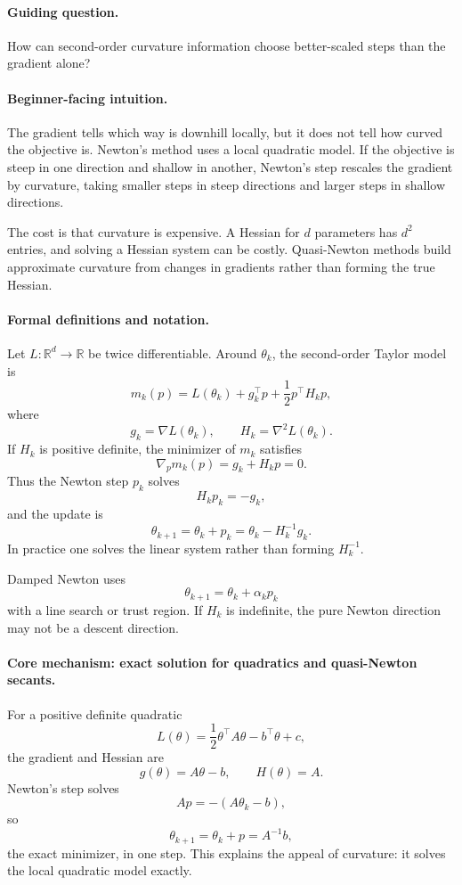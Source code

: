 \paragraph{Guiding question.}
How can second-order curvature information choose better-scaled steps than the gradient alone?

\paragraph{Beginner-facing intuition.}
The gradient tells which way is downhill locally, but it does not tell how curved the objective is. Newton's method uses a local quadratic model. If the objective is steep in one direction and shallow in another, Newton's step rescales the gradient by curvature, taking smaller steps in steep directions and larger steps in shallow directions.

The cost is that curvature is expensive. A Hessian for \(d\) parameters has \(d^2\) entries, and solving a Hessian system can be costly. Quasi-Newton methods build approximate curvature from changes in gradients rather than forming the true Hessian.

\paragraph{Formal definitions and notation.}
Let \(L:\mathbb R^d\to\mathbb R\) be twice differentiable. Around \(\theta_k\), the second-order Taylor model is
\[
m_k(p)
=L(\theta_k)+g_k^\top p+\frac12p^\top H_kp,
\]
where
\[
g_k=\nabla L(\theta_k),\qquad H_k=\nabla^2L(\theta_k).
\]
If \(H_k\) is positive definite, the minimizer of \(m_k\) satisfies
\[
\nabla_p m_k(p)=g_k+H_kp=0.
\]
Thus the Newton step \(p_k\) solves
\[
\boxed{
H_kp_k=-g_k,
}
\]
and the update is
\[
\theta_{k+1}=\theta_k+p_k
=\theta_k-H_k^{-1}g_k.
\]
In practice one solves the linear system rather than forming \(H_k^{-1}\).

Damped Newton uses
\[
\theta_{k+1}=\theta_k+\alpha_k p_k
\]
with a line search or trust region. If \(H_k\) is indefinite, the pure Newton direction may not be a descent direction.

\paragraph{Core mechanism: exact solution for quadratics and quasi-Newton secants.}
For a positive definite quadratic
\[
L(\theta)=\frac12\theta^\top A\theta-b^\top\theta+c,
\]
the gradient and Hessian are
\[
g(\theta)=A\theta-b,\qquad H(\theta)=A.
\]
Newton's step solves
\[
Ap=-(A\theta_k-b),
\]
so
\[
\theta_{k+1}=\theta_k+p=A^{-1}b,
\]
the exact minimizer, in one step. This explains the appeal of curvature: it solves the local quadratic model exactly.

